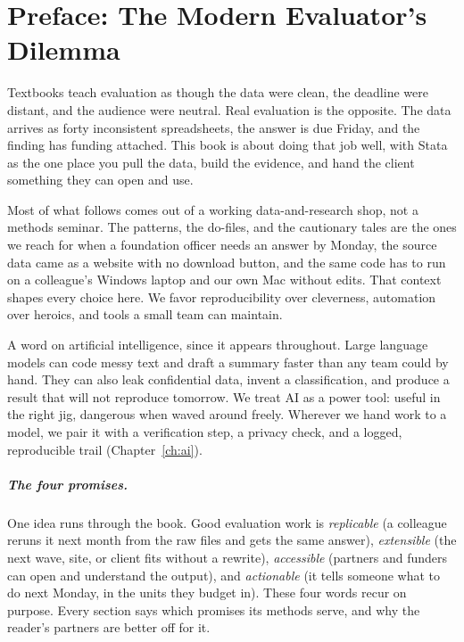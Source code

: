 \documentclass[
    a4paper,
    fontsize=10pt,
    twoside=true,
    numbers=noenddot,
]{kaobook}
\begin{document}
\mainmatter
{}

\chapter*{Preface: The Modern Evaluator's Dilemma}

\begin{fullwidthpar}
Textbooks teach evaluation as though the data were clean, the deadline were distant, and the audience were neutral. Real evaluation is the opposite. The data arrives as forty inconsistent spreadsheets, the answer is due Friday, and the finding has funding attached. This book is about doing that job well, with Stata as the one place you pull the data, build the evidence, and hand the client something they can open and use.
\end{fullwidthpar}

Most of what follows comes out of a working data-and-research shop, not a methods seminar. The patterns, the do-files, and the cautionary tales are the ones we reach for when a foundation officer needs an answer by Monday, the source data came as a website with no download button, and the same code has to run on a colleague's Windows laptop and our own Mac without edits. That context shapes every choice here. We favor reproducibility over cleverness, automation over heroics, and tools a small team can maintain.

A word on artificial intelligence, since it appears throughout. Large language models can code messy text and draft a summary faster than any team could by hand. They can also leak confidential data, invent a classification, and produce a result that will not reproduce tomorrow. We treat AI as a power tool: useful in the right jig, dangerous when waved around freely. Wherever we hand work to a model, we pair it with a verification step, a privacy check, and a logged, reproducible trail (Chapter~\ref{ch:ai}).

\paragraph{The four promises.} One idea runs through the book. Good evaluation work is \emph{replicable} (a colleague reruns it next month from the raw files and gets the same answer), \emph{extensible} (the next wave, site, or client fits without a rewrite), \emph{accessible} (partners and funders can open and understand the output), and \emph{actionable} (it tells someone what to do next Monday, in the units they budget in). These four words recur on purpose. Every section says which promises its methods serve, and why the reader's partners are better off for it.
\end{document}
